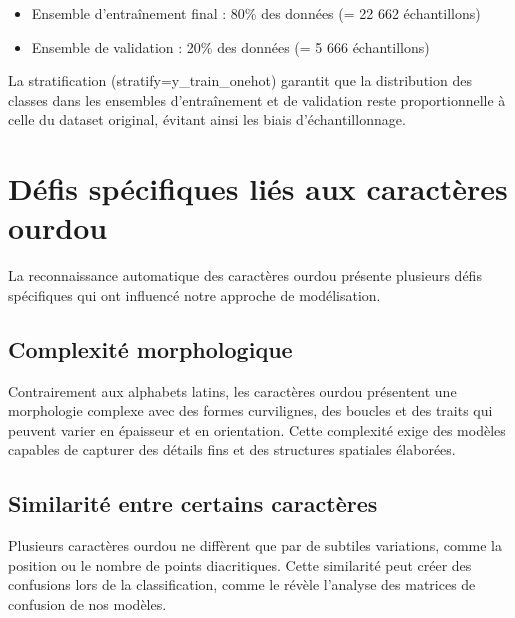 \begin{itemize}
\item Ensemble d'entraînement final : 80\% des données (= 22 662 échantillons)
\item Ensemble de validation : 20\% des données (= 5 666 échantillons)
\end{itemize}

\begin{flushleft}
La stratification (stratify=y\_train\_onehot) garantit que la distribution des classes dans les ensembles d'entraînement et de validation reste proportionnelle à celle du dataset original, évitant ainsi les biais d'échantillonnage.
\end{flushleft}

\section{Défis spécifiques liés aux caractères ourdou}
\begin{flushleft}
La reconnaissance automatique des caractères ourdou présente plusieurs défis spécifiques qui ont influencé notre approche de modélisation.
\end{flushleft}

\subsection{Complexité morphologique}
\begin{flushleft}
Contrairement aux alphabets latins, les caractères ourdou présentent une morphologie complexe avec des formes curvilignes, des boucles et des traits qui peuvent varier en épaisseur et en orientation. Cette complexité exige des modèles capables de capturer des détails fins et des structures spatiales élaborées.
\end{flushleft}

\subsection{Similarité entre certains caractères}

\begin{flushleft}
Plusieurs caractères ourdou ne diffèrent que par de subtiles variations, comme la position ou le nombre de points diacritiques. Cette similarité peut créer des confusions lors de la classification, comme le révèle l'analyse des matrices de confusion de nos modèles.
\end{flushleft}

